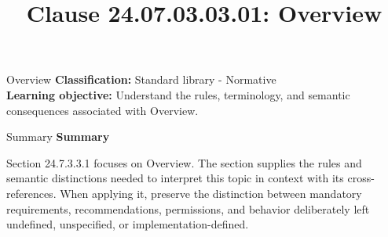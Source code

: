 \documentclass[10pt,letterpaper]{article}
\title{Clause 24.07.03.03.01: Overview}
\author{}
\date{}
\begin{document}
\maketitle
\begin{CornellOverviewBox}{Overview}
\textbf{Classification:} Standard library - Normative\\[2pt]
\textbf{Learning objective:} Understand the rules, terminology, and semantic consequences associated with Overview.
\end{CornellOverviewBox}\begin{CornellSummaryBox}{Summary}
{\sffamily\bfseries\color{Accent} Summary}\par\vspace{3pt}Section 24.7.3.3.1 focuses on Overview. The section supplies the rules and semantic distinctions needed to interpret this topic in context with its cross-references. When applying it, preserve the distinction between mandatory requirements, recommendations, permissions, and behavior deliberately left undefined, unspecified, or implementation-defined.
\end{CornellSummaryBox}
\end{document}

